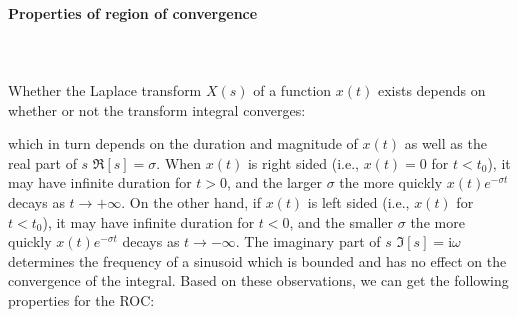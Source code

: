 	\paragraph{Properties of region of convergence}\mbox{}\\\\
	Whether the Laplace transform $X(s)$ of a function $x(t)$ exists depends on whether or not the transform integral converges:
	
	which in turn depends on the duration and magnitude of $x(t)$ as well as the real part of $s$ $\Re[s]=\sigma$. When $x(t)$ is right sided (i.e., $x(t)=0$ for $t<t_0$), it may have infinite duration for $t>0$, and the larger $\sigma$ the more quickly $x(t)e^{-\sigma t}$ decays as $t \rightarrow +\infty$. On the other hand, if $x(t)$ is left sided (i.e., $x(t)$ for $t<t_0$), it may have infinite duration for $t<0$, and the smaller $\sigma$ the more quickly $x(t)e^{-\sigma t}$ decays as $t \rightarrow -\infty$. The imaginary part of $s$ $\Im[s]=\mathrm{i}\omega$ determines the frequency of a sinusoid which is bounded and has no effect on the convergence of the integral. Based on these observations, we can get the following properties for the ROC:	
